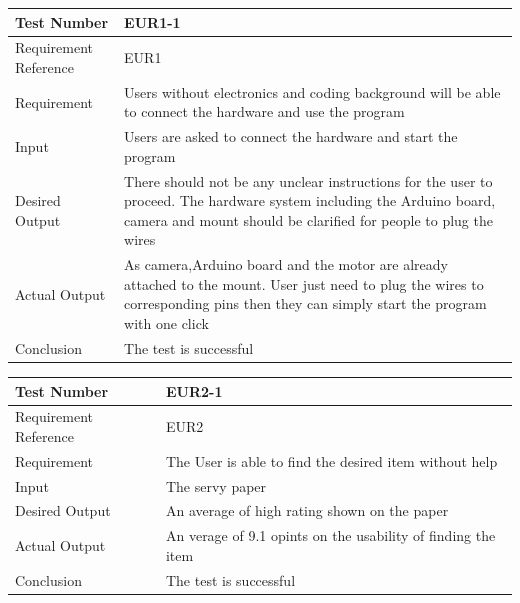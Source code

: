\documentclass[12pt, titlepage]{article}
\begin{document}
\begin{table}[H]
\begin{center}
\begin{tabular}{|l | m{9cm}|}
\hline
  Test Number & EUR1-1\\
  \hline
  Requirement Reference & EUR1\\
  \hline
  Requirement &  Users without electronics and coding background will be able to connect the hardware and use the program\\
  \hline
  Input & Users are asked to connect the hardware and start the program\\
  \hline
  Desired Output & There should not be any unclear instructions for the user to proceed. The hardware system including the Arduino board, camera and mount should be clarified for people to plug the wires\\
  \hline
  Actual Output & As camera,Arduino board and the motor are already attached to the mount. User just need to plug the wires to corresponding pins then they can simply start the program with one click \\
  \hline
  Conclusion & The test is successful\\
  \hline
\end{tabular}
\end{center}           
\end{table}

\begin{table}[H]
\begin{center}
\begin{tabular}{|l | m{9cm}|}
\hline
  Test Number & EUR2-1\\
  \hline
  Requirement Reference & EUR2\\
  \hline
  Requirement & The User is able to find the desired item without help\\
  \hline
  Input & The servy paper\\
  \hline
  Desired Output & An average of high rating shown on the paper\\
  \hline
  Actual Output & An verage of 9.1 opints on the usability of finding the item\\
  \hline
  Conclusion & The test is successful\\
  \hline
\end{tabular}
\end{center}           
\end{table}
\end{document}
